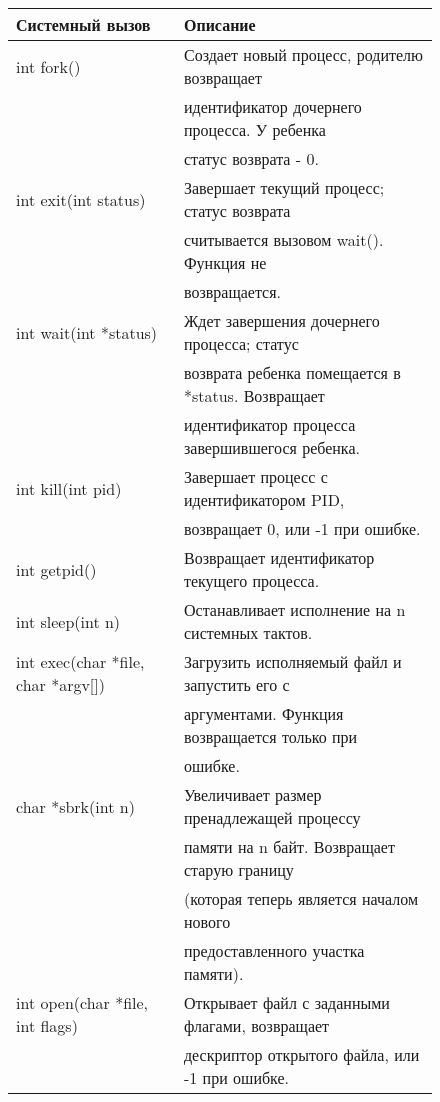 \begin{figure}[t]
\center
\begin{tabular}{ll}
{\bf Системный вызов} & {\bf Описание} \\
\midrule
\midrule
int fork() & Создает новый процесс, родителю возвращает \\
           & идентификатор дочернего процесса. У ребенка \\
           & статус возврата - 0. \\
\midrule
int exit(int status) & Завершает текущий процесс; статус возврата \\
                     & считывается вызовом wait(). Функция не \\
                     & возвращается. \\
\midrule
int wait(int *status) & Ждет завершения дочернего процесса; статус \\
                      & возврата ребенка помещается в *status. Возвращает \\
                      & идентификатор процесса завершившегося ребенка. \\
\midrule
int kill(int pid) & Завершает процесс с идентификатором PID, \\
                  & возвращает 0, или -1 при ошибке. \\
\midrule
int getpid() & Возвращает идентификатор текущего процесса. \\
\midrule
int sleep(int n) & Останавливает исполнение на n системных тактов. \\
\midrule
int exec(char *file, char *argv[]) & Загрузить исполняемый файл и запустить его с \\
                                   & аргументами. Функция возвращается только при \\
                                   & ошибке. \\
\midrule
char *sbrk(int n) & Увеличивает размер пренадлежащей процессу \\
                  & памяти на n байт. Возвращает старую границу \\
                  & (которая теперь является началом нового \\
                  & предоставленного участка памяти). \\
\midrule
int open(char *file, int flags) & Открывает файл с заданными флагами, возвращает \\
                                & дескриптор открытого файла, или -1 при ошибке. \\

\end{tabular}
\end{figure}
